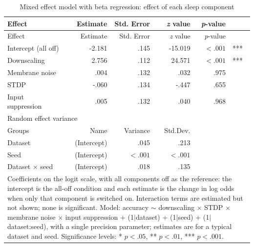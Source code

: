 {
\setlength{\tabcolsep}{10pt} %
\begin{longtable}{lrrrrl}
    \caption{Mixed effect model with beta regression: effect of each sleep component \label{tab:betareg_ablation}}\\
    \toprule
    Effect  & Estimate & Std. Error & \textit{z} value & \textit{p}-value & \\
    \midrule
    \endfirsthead

    \toprule
    Effect  & Estimate & Std. Error & \textit{z} value & \textit{p}-value & \\
    \midrule
    \endhead
        Intercept (all off) & -2.181 & .145 & -15.019 & $<.001$ & ***\\
        Downscaling & 2.756 & .112 & 24.571 & $<.001$ & ***\\
        Membrane noise & .004 & .132 & .032 & .975 & \\
        STDP & -.060 & .134 & -.447 & .655 & \\
        Input suppression & .005 & .132 & .040 & .968 & \\
        \midrule
        \multicolumn{2}{l}{Random effect variance}\\
        Groups & Name & Variance & Std.Dev.& &\\
        Dataset & (Intercept) & .045 & .213 & &\\
        Seed & (Intercept) & $< .001$ & $< .001$ & &\\
        Dataset $\times$ seed & (Intercept) & .018 & .135 & &\\

        \bottomrule
    \multicolumn{6}{p{0.9\linewidth}}{\footnotesize Coefficients on the logit scale, with all components off as the reference: the intercept is the all-off condition and each estimate is the change in log odds when only that component is switched on. Interaction terms are estimated but not shown; none is significant. Model: accuracy $\sim$ downscaling $\times$ STDP $\times$ membrane noise $\times$ input suppression + (1$|$dataset) + (1$|$seed) + (1$|$dataset:seed), with a single precision parameter; estimates are for a typical dataset and seed. Significance levels: * $p<.05$, ** $p<.01$, *** $p<.001$.}\\
\end{longtable}
}
